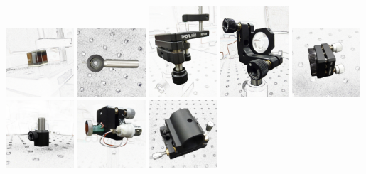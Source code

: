 


\graphicspath{{./images/}}

\includegraphics[width=1in]{BeamSplitterCube}
\includegraphics[width=1in]{Iris}
\includegraphics[width=1in]{KinematicPlatformMount}
\includegraphics[width=1in]{LensinHolder}
\includegraphics[width=1in]{MirrorMount}
\includegraphics[width=1in]{OpticalPostwPostHolder}
\includegraphics[width=1in]{PiezoandMirror}
\includegraphics[width=1in]{ULMTiltKinematicLaserMount}